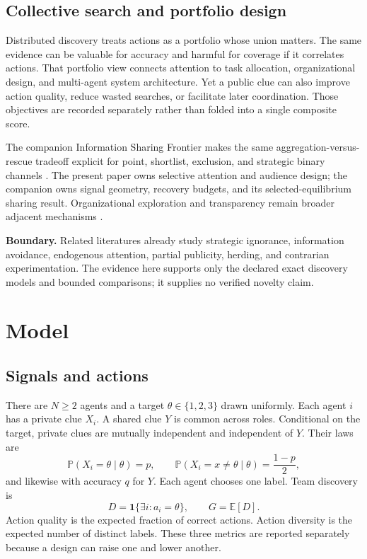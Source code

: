 \documentclass[11pt]{article}
\newcommand{\E}{\mathbb{E}}
\newcommand{\Prb}{\mathbb{P}}
\newcommand{\Boundary}[1]{\par\noindent\textbf{Boundary.} #1\par}
\begin{document}
\subsection{Collective search and portfolio design}

Distributed discovery treats actions as a portfolio whose union matters. The
same evidence can be valuable for accuracy and harmful for coverage if it
correlates actions. That portfolio view connects attention to task allocation,
organizational design, and multi-agent system architecture. Yet a public clue
can also improve action quality, reduce wasted searches, or facilitate later
coordination. Those objectives are recorded separately rather than folded into
a single composite score.

The companion Information Sharing Frontier makes the same aggregation-versus-
rescue tradeoff explicit for point, shortlist, exclusion, and strategic binary
channels \citep{Nakajima2026InformationSharingFrontier}. The present paper owns
selective attention and audience design; the companion owns signal geometry,
recovery budgets, and its selected-equilibrium sharing result. Organizational
exploration and transparency remain broader adjacent mechanisms
\citep{March1991,LazerFriedman2007,Bernstein2012}.

\Boundary{Related literatures already study strategic ignorance, information
avoidance, endogenous attention, partial publicity, herding, and contrarian
experimentation. The evidence here supports only the declared exact discovery
models and bounded comparisons; it supplies no verified novelty claim.}

\section{Model}

\subsection{Signals and actions}

There are $N\geq2$ agents and a target $\theta\in\{1,2,3\}$ drawn uniformly.
Each agent $i$ has a private clue $X_i$. A shared clue $Y$ is common across
roles. Conditional on the target, private clues are mutually independent and
independent of $Y$. Their laws are
\[
 \Prb(X_i=\theta\mid\theta)=p,
 \qquad
 \Prb(X_i=x\ne\theta\mid\theta)=\frac{1-p}{2},
\]
and likewise with accuracy $q$ for $Y$. Each agent chooses one label. Team
discovery is
\[
 D=\mathbf 1\{\exists i:a_i=\theta\},
 \qquad G=\E[D].
\]
Action quality is the expected fraction of correct actions. Action diversity is
the expected number of distinct labels. These three metrics are reported
separately because a design can raise one and lower another.
\end{document}
